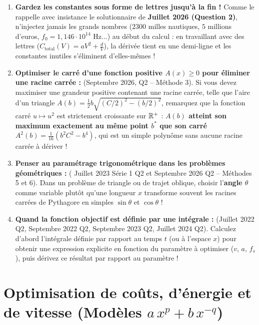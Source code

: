\begin{astuce}
\begin{enumerate}
    \item \textbf{Gardez les constantes sous forme de lettres jusqu'à la fin !} Comme le rappelle avec insistance le solutionnaire de \textbf{Juillet 2026 (Question 2)}, n'injectez jamais les grands nombres ($2300$ milles nautiques, $5$ millions d'euros, $f_0 = 1,146\cdot 10^{14}\text{ Hz}$...) au début du calcul : en travaillant avec des lettres ($C_{\text{total}}(V) = aV^2 + \frac{d}{V}$), la dérivée tient en une demi-ligne et les constantes inutiles s'éliminent d'elles-mêmes !
    \item \textbf{Optimiser le carré d'une fonction positive $A(x) \ge 0$ pour éliminer une racine carrée :} (Septembre 2026, Q2 -- Méthode 3). Si vous devez maximiser une grandeur positive contenant une racine carrée, telle que l'aire d'un triangle $A(b) = \frac{1}{2}b\sqrt{(C/2)^2 - (b/2)^2}$, remarquez que la fonction carré $u \mapsto u^2$ est strictement croissante sur $\mathbb{R}^+$ : \textbf{$A(b)$ atteint son maximum exactement au même point $b^*$ que son carré $A^2(b) = \frac{1}{16}(b^2 C^2 - b^4)$}, qui est un simple polynôme sans aucune racine carrée à dériver !
    \item \textbf{Penser au paramétrage trigonométrique dans les problèmes géométriques :} ( Juillet 2023 Série 1 Q2 et Septembre 2026 Q2 -- Méthodes 5 et 6). Dans un problème de triangle ou de trajet oblique, choisir l'\textbf{angle $\theta$} comme variable plutôt qu'une longueur $x$ transforme souvent les racines carrées de Pythagore en simples $\sin\theta$ et $\cos\theta$ !
    \item \textbf{Quand la fonction objectif est définie par une intégrale :} (Juillet 2022 Q2, Septembre 2022 Q2, Septembre 2023 Q2, Juillet 2024 Q2). Calculez d'abord l'intégrale définie par rapport au temps $t$ (ou à l'espace $x$) pour obtenir une expression explicite en fonction du paramètre à optimiser ($v$, $a$, $f_s$), puis dérivez ce résultat par rapport au paramètre !
\end{enumerate}
\end{astuce}

\section{Optimisation de coûts, d'énergie et de vitesse (Modèles $a\,x^p + b\,x^{-q}$)}

